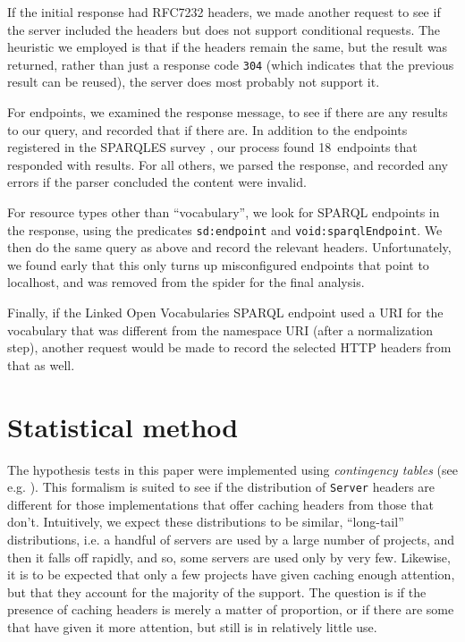 \documentclass[a4paper,english]{article}
\newcommand{\rdfterm}[1]{\texttt{#1}}
\newcommand{\httph}[1]{\texttt{#1}}
\begin{document}
If the initial response had RFC7232 headers, we made another
request to see if the server included the headers but does not
support conditional requests. The heuristic we employed is
that if the headers remain the same, but the result was returned,
rather than just a response code \httph{304} (which indicates that the
previous result can be reused), the server does most probably not
support it.

For endpoints, we examined the response message, to see if there are
any results to our query, and recorded that if there are. In addition
to the endpoints registered in the SPARQLES survey
\cite{buil2013sparql}, our process found 18~endpoints that responded
with results. For all others, we parsed the response, and recorded any
errors if the parser concluded the content were invalid.

For resource types other than ``vocabulary'', we look for SPARQL
endpoints in the response, using the predicates \rdfterm{sd:endpoint}
and \rdfterm{void:sparqlEndpoint}. We then do the same query as above
and record the relevant headers. Unfortunately, we found early that
this only turns up misconfigured endpoints that point to localhost,
and was removed from the spider for the final analysis.

Finally, if the Linked Open Vocabularies \cite{lov2} SPARQL endpoint
used a URI for the vocabulary that was different from the namespace
URI (after a normalization step), another request would be made to
record the selected HTTP headers from that as well.

\section{Statistical method}\label{app:stats}

The hypothesis tests in this paper were implemented using \emph{contingency
  tables} (see e.g. \cite{kn:bj}). This formalism is suited to see if the
distribution of  \httph{Server} headers are different for those implementations that
offer caching headers from those that don't. Intuitively, we expect
these distributions to be similar, ``long-tail'' distributions, i.e. a
handful of servers are used by a large number of projects, and then it
falls off rapidly, and so, some servers are used only by very
few. Likewise, it is to be expected that only a few projects have
given caching enough attention, but that they account for the majority
of the support. The question is if the presence of caching headers is
merely a matter of proportion, or if there are some that have given it
more attention, but still is in relatively little use.
\end{document}
